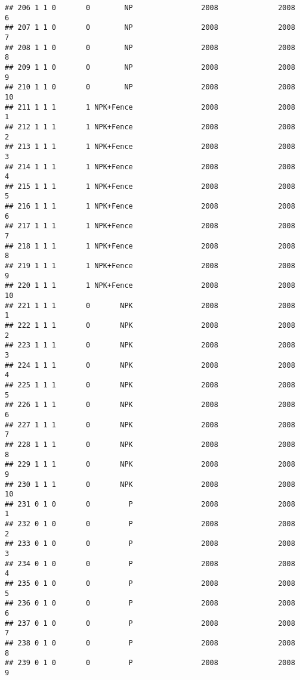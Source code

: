 \documentclass[]{article}
\begin{document}
\begin{verbatim}
## 206 1 1 0       0        NP                2008              2008        6
## 207 1 1 0       0        NP                2008              2008        7
## 208 1 1 0       0        NP                2008              2008        8
## 209 1 1 0       0        NP                2008              2008        9
## 210 1 1 0       0        NP                2008              2008       10
## 211 1 1 1       1 NPK+Fence                2008              2008        1
## 212 1 1 1       1 NPK+Fence                2008              2008        2
## 213 1 1 1       1 NPK+Fence                2008              2008        3
## 214 1 1 1       1 NPK+Fence                2008              2008        4
## 215 1 1 1       1 NPK+Fence                2008              2008        5
## 216 1 1 1       1 NPK+Fence                2008              2008        6
## 217 1 1 1       1 NPK+Fence                2008              2008        7
## 218 1 1 1       1 NPK+Fence                2008              2008        8
## 219 1 1 1       1 NPK+Fence                2008              2008        9
## 220 1 1 1       1 NPK+Fence                2008              2008       10
## 221 1 1 1       0       NPK                2008              2008        1
## 222 1 1 1       0       NPK                2008              2008        2
## 223 1 1 1       0       NPK                2008              2008        3
## 224 1 1 1       0       NPK                2008              2008        4
## 225 1 1 1       0       NPK                2008              2008        5
## 226 1 1 1       0       NPK                2008              2008        6
## 227 1 1 1       0       NPK                2008              2008        7
## 228 1 1 1       0       NPK                2008              2008        8
## 229 1 1 1       0       NPK                2008              2008        9
## 230 1 1 1       0       NPK                2008              2008       10
## 231 0 1 0       0         P                2008              2008        1
## 232 0 1 0       0         P                2008              2008        2
## 233 0 1 0       0         P                2008              2008        3
## 234 0 1 0       0         P                2008              2008        4
## 235 0 1 0       0         P                2008              2008        5
## 236 0 1 0       0         P                2008              2008        6
## 237 0 1 0       0         P                2008              2008        7
## 238 0 1 0       0         P                2008              2008        8
## 239 0 1 0       0         P                2008              2008        9

\end{verbatim}
\end{document}
